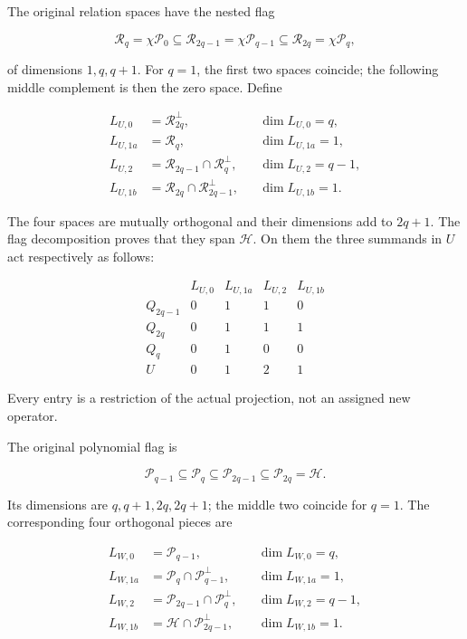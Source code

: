 The original relation spaces have the nested flag

\[
\mathcal R_q=\chi\mathcal P_0
\subseteq\mathcal R_{2q-1}=\chi\mathcal P_{q-1}
\subseteq\mathcal R_{2q}=\chi\mathcal P_q,
\tag{WS5}
\]

of dimensions \(1,q,q+1\). For \(q=1\), the first two spaces coincide; the following middle complement is then the zero space. Define

\[
\begin{aligned}
L_{U,0}&=\mathcal R_{2q}^{\perp},\qquad &&\dim L_{U,0}=q,\\
L_{U,1a}&=\mathcal R_q, &&\dim L_{U,1a}=1,\\
L_{U,2}&=\mathcal R_{2q-1}\cap\mathcal R_q^{\perp},
&&\dim L_{U,2}=q-1,\\
L_{U,1b}&=\mathcal R_{2q}\cap\mathcal R_{2q-1}^{\perp},
&&\dim L_{U,1b}=1.
\end{aligned}
\tag{WS6}
\]

The four spaces are mutually orthogonal and their dimensions add to \(2q+1\). The flag decomposition proves that they span \(\mathcal H\). On them the three summands in \(U\) act respectively as follows:

\[
\begin{array}{c|rrrr}
&L_{U,0}&L_{U,1a}&L_{U,2}&L_{U,1b}\\\hline
Q_{2q-1}&0&1&1&0\\
Q_{2q}&0&1&1&1\\
Q_q&0&1&0&0\\\hline
U&0&1&2&1
\end{array}
\tag{WS7}
\]

Every entry is a restriction of the actual projection, not an assigned new operator.

The original polynomial flag is

\[
\mathcal P_{q-1}\subseteq\mathcal P_q
\subseteq\mathcal P_{2q-1}\subseteq\mathcal P_{2q}=\mathcal H.
\tag{WS8}
\]

Its dimensions are \(q,q+1,2q,2q+1\); the middle two coincide for \(q=1\). The corresponding four orthogonal pieces are

\[
\begin{aligned}
L_{W,0}&=\mathcal P_{q-1},&&\dim L_{W,0}=q,\\
L_{W,1a}&=\mathcal P_q\cap\mathcal P_{q-1}^{\perp},
&&\dim L_{W,1a}=1,\\
L_{W,2}&=\mathcal P_{2q-1}\cap\mathcal P_q^{\perp},
&&\dim L_{W,2}=q-1,\\
L_{W,1b}&=\mathcal H\cap\mathcal P_{2q-1}^{\perp},
&&\dim L_{W,1b}=1.
\end{aligned}
\tag{WS9}
\]

